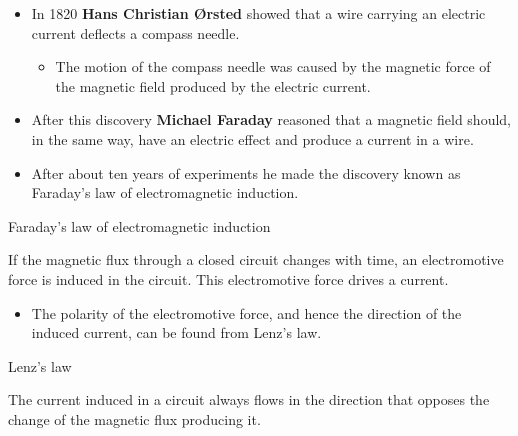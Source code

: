 \ELhold


\begin{ELunit}

\begin{itemize}
\tightlist
\item
  In 1820 \textbf{Hans Christian Ørsted} showed that a wire carrying an electric current deflects a compass needle.

  \begin{itemize}
  \tightlist
  \item
    The motion of the compass needle was caused by the magnetic force of the magnetic field produced by the electric current.
  \end{itemize}
\item
  After this discovery \textbf{Michael Faraday} reasoned that a magnetic field should, in the same way, have an electric effect and produce a current in a wire.
\item
  After about ten years of experiments he made the discovery known as Faraday's law of electromagnetic induction.
\end{itemize}

\end{ELunit}

\begin{ELdefinition}{Faraday's law of electromagnetic induction}

If the magnetic flux through a closed circuit changes with time, an electromotive force is induced in the circuit. This electromotive force drives a current.

\end{ELdefinition}

\begin{ELjoin}

\begin{itemize}
\tightlist
\item
  The polarity of the electromotive force, and hence the direction of the induced current, can be found from Lenz's law.
\end{itemize}

\begin{ELdefinition}{Lenz's law}

The current induced in a circuit always flows in the direction that opposes the change of the magnetic flux producing it.

\end{ELdefinition}

\end{ELjoin}

